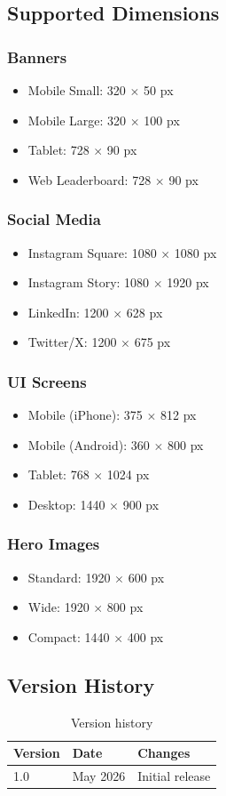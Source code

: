 \documentclass[11pt,a4paper]{article}
\begin{document}
\subsection{Supported Dimensions}

\subsubsection{Banners}
\begin{itemize}
    \item Mobile Small: 320 $\times$ 50 px
    \item Mobile Large: 320 $\times$ 100 px
    \item Tablet: 728 $\times$ 90 px
    \item Web Leaderboard: 728 $\times$ 90 px
\end{itemize}

\subsubsection{Social Media}
\begin{itemize}
    \item Instagram Square: 1080 $\times$ 1080 px
    \item Instagram Story: 1080 $\times$ 1920 px
    \item LinkedIn: 1200 $\times$ 628 px
    \item Twitter/X: 1200 $\times$ 675 px
\end{itemize}

\subsubsection{UI Screens}
\begin{itemize}
    \item Mobile (iPhone): 375 $\times$ 812 px
    \item Mobile (Android): 360 $\times$ 800 px
    \item Tablet: 768 $\times$ 1024 px
    \item Desktop: 1440 $\times$ 900 px
\end{itemize}

\subsubsection{Hero Images}
\begin{itemize}
    \item Standard: 1920 $\times$ 600 px
    \item Wide: 1920 $\times$ 800 px
    \item Compact: 1440 $\times$ 400 px
\end{itemize}

\subsection{Version History}

\begin{table}[h]
\centering
\begin{tabular}{@{}lll@{}}
\toprule
\textbf{Version} & \textbf{Date} & \textbf{Changes} \\
\midrule
1.0 & May 2026 & Initial release \\
\bottomrule
\end{tabular}
\caption{Version history}
\end{table}
\end{document}
